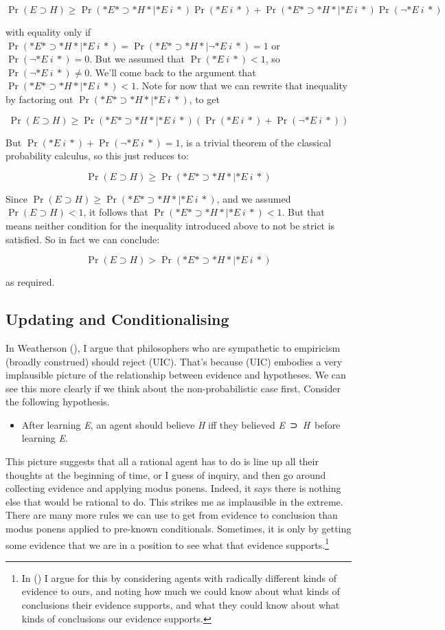 \documentclass[
  10pt,
  letterpaper,
  DIV=11,
  numbers=noendperiod,
  twoside]{scrartcl}
\providecommand{\tightlist}{%
  \setlength{\itemsep}{0pt}\setlength{\parskip}{0pt}}\usepackage{longtable,booktabs,array}
\begin{document}
\[\Pr(E \supset H) \geq \Pr(*E* ⊃ *H*| *E~i~*)\Pr(*E~i~*) + \Pr(*E* ⊃ *H*| *E~i~*)\Pr(\neg *E~i~*)\]

with equality only if
\(\Pr(*E* ⊃ *H*| *E~i~*) = \Pr(*E* ⊃ *H*| \neg *E~i~*) = 1\) or
\(\Pr(\neg *E~i~*) = 0\). But we assumed that \(\Pr(*E~i~*) < 1\), so
\(\Pr(\neg *E~i~*) \neq 0\). We'll come back to the argument that
\(\Pr(*E* ⊃ *H*| *E~i~*) < 1\). Note for now that we can rewrite that
inequality by factoring out \(\Pr(*E* ⊃ *H*| *E~i~*)\), to get

\[\Pr(E \supset H) \geq \Pr(*E* ⊃ *H*| *E~i~*)(\Pr(*E~i~*) + \Pr(\neg *E~i~*))\]

But \(\Pr(*E~i~*) + \Pr(\neg *E~i~*) = 1\), is a trivial theorem of the
classical probability calculus, so this just reduces to:

\[\Pr(E \supset H) \geq \Pr(*E* ⊃ *H*| *E~i~*)\]

Since \(\Pr(E \supset H) \geq \Pr(*E* ⊃ *H*| *E~i~*)\), and we assumed
\(\Pr(E \supset H) < 1\), it follows that
\(\Pr(*E* ⊃ *H*| *E~i~*) < 1\). But that means neither condition for the
inequality introduced above to not be strict is satisfied. So in fact we
can conclude:

\[\Pr(E \supset H) > \Pr(*E* ⊃ *H*| *E~i~*)\]

as required.

\subsection{Updating and
Conditionalising}\label{updating-and-conditionalising}

In Weatherson (), I argue that
philosophers who are sympathetic to empiricism (broadly construed)
should reject (UIC). That's because (UIC) embodies a very implausible
picture of the relationship between evidence and hypotheses. We can see
this more clearly if we think about the non-probabilistic case first.
Consider the following hypothesis.

\begin{itemize}
\tightlist
\item
  After learning \emph{E}, an agent should believe \emph{H} iff they
  believed \emph{E}~⊃~\emph{H}~before learning \emph{E}.
\end{itemize}

This picture suggests that all a rational agent has to do is line up all
their thoughts at the beginning of time, or I guess of inquiry, and then
go around collecting evidence and applying modus ponens. Indeed, it says
there is nothing else that would be rational to do. This strikes me as
implausible in the extreme. There are many more rules we can use to get
from evidence to conclusion than modus ponens applied to pre-known
conditionals. Sometimes, it is only by getting some evidence that we are
in a position to see what that evidence supports.\footnote{In
  () I argue for this by
  considering agents with radically different kinds of evidence to ours,
  and noting how much we could know about what kinds of conclusions
  their evidence supports, and what they could know about what kinds of
  conclusions our evidence supports.}
\end{document}
